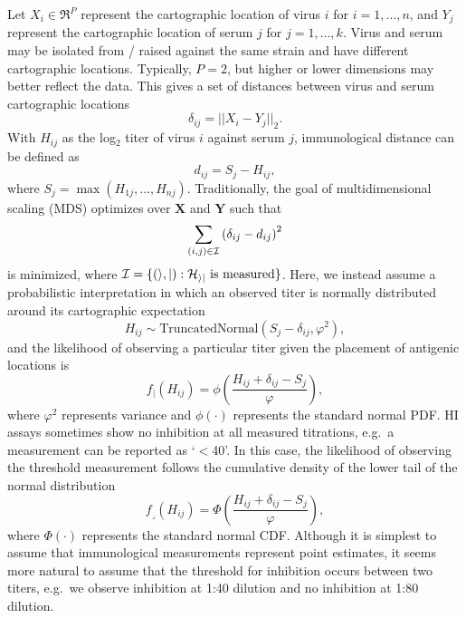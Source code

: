 \documentclass[11pt,oneside,letterpaper]{article}
\newcommand{\point}{f_{\scriptscriptstyle \vert}}	%
\newcommand{\threshold}{f_{\textstyle \lrcorner}}	%
\newcommand{\mdssd}{\varphi}						%
\newcommand{\vn}{n}									%
\newcommand{\sn}{k}									%
\begin{document}
Let $X_i \in \Re^{P}$ represent the cartographic location of virus $i$ for $i = 1,\ldots,\vn$, and $Y_j$ represent the cartographic location of serum $j$ for $j = 1,\ldots,\sn$.
Virus and serum may be isolated from / raised against the same strain and have different cartographic locations.
Typically, $P = 2$, but higher or lower dimensions may better reflect the data.  
This gives a set of distances between virus and serum cartographic locations 
\begin{equation}
	\delta_{ij} =  || X_i - Y_j ||_2.
\end{equation}
With $H_{ij}$ as the log$_2$ titer of virus $i$ against serum $j$, immunological distance can be defined as
\begin{equation}
	d_{ij} =  S_j - H_{ij},
\end{equation}
where $S_j = \max ( H_{1j},\ldots,H_{\vn j} )$.
Traditionally, the goal of multidimensional scaling (MDS) optimizes over $\mathbf{X}$ and $\mathbf{Y}$ such that
\begin{equation}
	\sum_{(i,j) \in \cal I} 
	\left(
		\delta_{ij} - d_{ij}
	\right)^2
\end{equation}
is minimized, where $\cal I = \{ (i,j) : H_{ij} \mbox{ is measured} \}$. 
Here, we instead assume a probabilistic interpretation in which an observed titer is normally distributed around its cartographic expectation
\begin{equation} \label{hij}
	H_{ij} \sim \mbox{TruncatedNormal}( S_j - \delta_{ij}, \mdssd^2 ),
\end{equation}
and the likelihood of observing a particular titer given the placement of antigenic locations is 
\begin{equation} 
	\point(H_{ij}) = \phi \left( \frac{ H_{ij} + \delta_{ij} - S_j }{ \mdssd } \right),
\end{equation}
where $\mdssd^2$ represents variance and $\phi(\cdot)$ represents the standard normal PDF.
HI assays sometimes show no inhibition at all measured titrations, e.g.\ a measurement can be reported as `$<$40'.
In this case, the likelihood of observing the threshold measurement follows the cumulative density of the lower tail of the normal distribution
\begin{equation} 
	\threshold(H_{ij}) = \Phi \left( \frac{ H_{ij} + \delta_{ij} - S_j }{ \mdssd } \right),
\end{equation}
where $\Phi(\cdot)$ represents the standard normal CDF.
Although it is simplest to assume that immunological measurements represent point estimates, it seems more natural to assume that the threshold for inhibition occurs between two titers, e.g.\ we observe inhibition at 1:40 dilution and no inhibition at 1:80 dilution.
\end{document}
